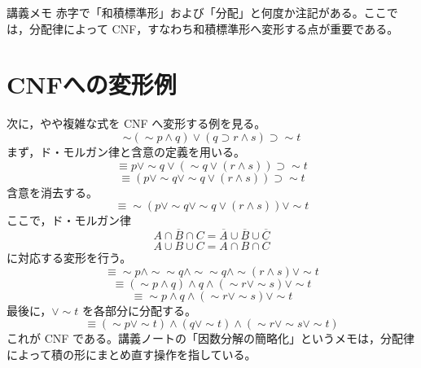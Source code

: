 \documentclass[../main.tex]{subfiles}
\begin{document}
\begin{sidebox}[TBred]{講義メモ}
  赤字で「和積標準形」および「分配」と何度か注記がある。ここでは，分配律によって CNF，すなわち和積標準形へ変形する点が重要である。
\end{sidebox}

\section{CNFへの変形例}

次に，やや複雑な式を CNF へ変形する例を見る。
\[
  \sim(\sim p \land q)
  \lor
  (q \supset r \land s)
  \supset
  \sim t
\]
まず，ド・モルガン律と含意の定義を用いる。
\[
  \equiv
  p \lor \sim q
  \lor
  (\sim q \lor (r \land s))
  \supset
  \sim t
\]
\[
  \equiv
  (p \lor \sim q \lor \sim q \lor (r \land s))
  \supset
  \sim t
\]
含意を消去する。
\[
  \equiv
  \sim(p \lor \sim q \lor \sim q \lor (r \land s))
  \lor
  \sim t
\]
ここで，ド・モルガン律
\[
  \overline{A \cap B \cap C}
  =
  \overline{A} \cup \overline{B} \cup \overline{C}
\]
\[
  \overline{A \cup B \cup C}
  =
  \overline{A} \cap \overline{B} \cap \overline{C}
\]
に対応する変形を行う。
\[
  \equiv
  \sim p
  \land
  \sim\sim q
  \land
  \sim\sim q
  \land
  \sim(r \land s)
  \lor
  \sim t
\]
\[
  \equiv
  (\sim p \land q)
  \land
  q
  \land
  (\sim r \lor \sim s)
  \lor
  \sim t
\]
\[
  \equiv
  \sim p \land q \land (\sim r \lor \sim s) \lor \sim t
\]
最後に，\(\lor \sim t\) を各部分に分配する。
\[
  \equiv
  (\sim p \lor \sim t)
  \land
  (q \lor \sim t)
  \land
  (\sim r \lor \sim s \lor \sim t)
\]
これが CNF である。講義ノートの「因数分解の簡略化」というメモは，分配律によって積の形にまとめ直す操作を指している。
\end{document}

